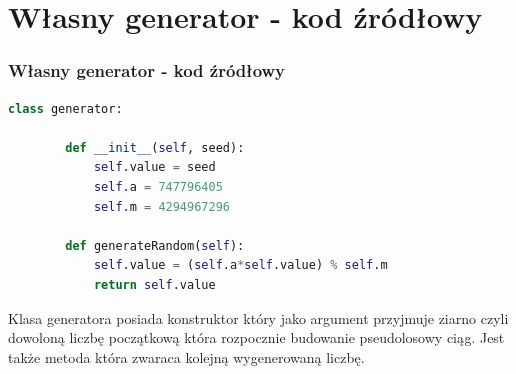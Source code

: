 \documentclass[9pt]{beamer}
\begin{document}
\section{Własny generator - kod źródłowy}
 \begin{frame}[containsverbatim]
  \frametitle{Własny generator - kod źródłowy}
   \begin{lstlisting}[language=Python, caption=Klasa generatora]
    class generator:

        def __init__(self, seed):
            self.value = seed
            self.a = 747796405
            self.m = 4294967296

        def generateRandom(self):
            self.value = (self.a*self.value) % self.m
            return self.value
    \end{lstlisting}
    Klasa generatora posiada konstruktor który jako argument przyjmuje ziarno czyli dowoloną liczbę początkową która rozpocznie budowanie pseudolosowy ciąg. Jest także metoda która zwaraca kolejną wygenerowaną liczbę.
\end{frame}
\end{document}
